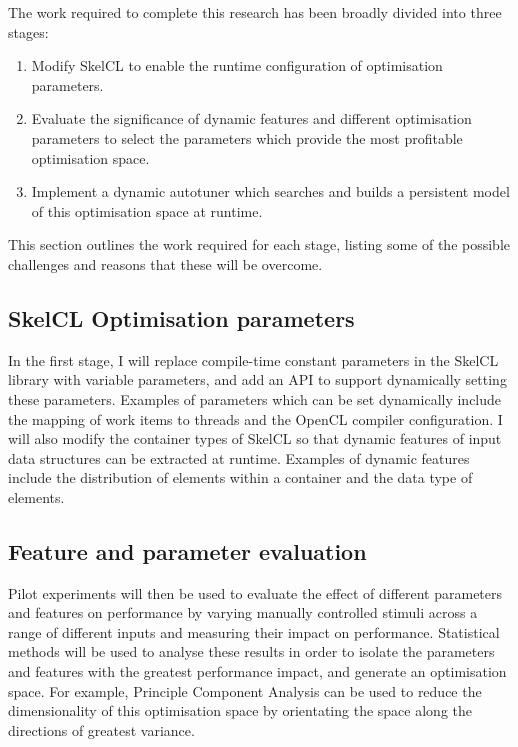 The work required to complete this research has been broadly divided
into three stages:

\begin{enumerate}
\item Modify SkelCL to enable the runtime configuration of
  optimisation parameters.
\item Evaluate the significance of dynamic features and different
  optimisation parameters to select the parameters which provide the
  most profitable optimisation space.
\item Implement a dynamic autotuner which searches and builds a
  persistent model of this optimisation space at runtime.
\end{enumerate}

This section outlines the work required for each stage, listing some
of the possible challenges and reasons that these will be overcome.


\subsection{SkelCL Optimisation parameters}
In the first stage, I will replace compile-time constant parameters in
the SkelCL library with variable parameters, and add an API to support
dynamically setting these parameters. Examples of parameters which can
be set dynamically include the mapping of work items to threads and
the OpenCL compiler configuration. I will also modify the container
types of SkelCL so that dynamic features of input data structures can
be extracted at runtime. Examples of dynamic features include the
distribution of elements within a container and the data type of
elements.

\subsection{Feature and parameter evaluation}
Pilot experiments will then be used to evaluate the effect of
different parameters and features on performance by varying manually
controlled stimuli across a range of different inputs and measuring
their impact on performance. Statistical methods will be used to
analyse these results in order to isolate the parameters and features
with the greatest performance impact, and generate an optimisation
space. For example, Principle Component Analysis can be used to reduce
the dimensionality of this optimisation space by orientating the space
along the directions of greatest variance.

